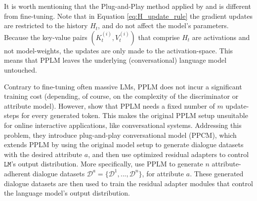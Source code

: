


It is worth mentioning that the Plug-and-Play method applied by \cite{dathathri2019plug} and \cite{madotto-etal-2020-plug} is different from fine-tuning. Note that in Equation \ref{eq:H_update_rule} the gradient updates are restricted to the history $H_t$, and do not affect the model's parameters. Because the key-value pairs $(K_t^{(i)}, V_t^{(i)})$ that comprise $H_t$ are activations and not model-weights, the updates are only made to the activation-space. This means that PPLM leaves the underlying (conversational) language model untouched.

Contrary to fine-tuning often massive LMs, PPLM does not incur a significant training cost (depending, of course, on the complexity of the discriminator or attribute model). However, \cite{madotto-etal-2020-plug} show that PPLM needs a fixed number of $m$ update-steps for every generated token. This makes the original PPLM setup unsuitable for online interactive applications, like conversational systems. Addressing this problem, they introduce plug-and-play conversational model (PPCM), which extends PPLM by using the original model setup to generate dialogue datasets with the desired attribute $a$, and then use optimized residual adapters \citep{bapna-firat-2019-simple} to control $\texttt{LM}$'s output distribution. More specifically, \cite{madotto-etal-2020-plug} use PPLM to generate $n$ attribute-adherent dialogue datasets $\mathscr{D}^a = \{\mathcal{D}^1, ..., \mathcal{D}^n\}$, for attribute $a$. These generated dialogue datasets are then used to train the residual adapter modules that control the language model's output distribution.

